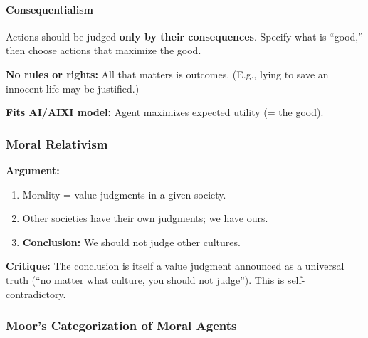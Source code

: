 \separator

\paragraph*{Consequentialism}

\begin{defbox}[Consequentialism]
Actions should be judged \textbf{only by their consequences}. Specify what is ``good,'' then choose actions that maximize the good.

\textbf{No rules or rights:} All that matters is outcomes. (E.g., lying to save an innocent life may be justified.)

\textbf{Fits AI/AIXI model:} Agent maximizes expected utility (= the good).
\end{defbox}

\bigseparator

\subsubsection{Moral Relativism}

\begin{defbox}
\textbf{Argument:}
\begin{enumerate}
  \item Morality = value judgments in a given society.
  \item Other societies have their own judgments; we have ours.
  \item \textbf{Conclusion:} We should not judge other cultures.
\end{enumerate}

\textbf{Critique:} The conclusion is itself a value judgment announced as a universal truth (``no matter what culture, you should not judge''). This is self-contradictory.
\end{defbox}

\bigseparator

\subsubsection{Moor's Categorization of Moral Agents}

